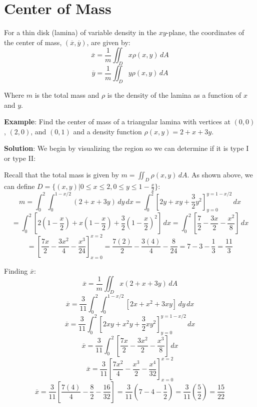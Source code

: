 \section{Center of Mass}
For a thin disk (lamina) of variable density in the $xy$-plane, the coordinates
of the center of mass, $(\overline{x}, \overline{y})$, are given by:
$$\overline{x} = \frac{1}{m} \iint_{\textit{D}} x \rho (x, y)\,dA$$
$$\overline{y} = \frac{1}{m} \iint_{\textit{D}} y \rho (x, y)\,dA$$

Where $m$ is the total mass and $\rho$ is the density of the lamina as a 
function of $x$ and $y$. 

\textbf{Example}: Find the center of mass of a triangular lamina with vertices 
at $(0, 0)$, $(2, 0)$, and $(0, 1)$ and a density function $\rho (x, y) = 2 + 
x + 3y$. 

\textbf{Solution}: We begin by visualizing the region so we can determine if 
it is type I or type II:


Recall that the total mass is given by $m = \iint_{\textit{D}} \rho (x, y)
\,dA$. As shown above, we can define $\textit{D} = \{ \left( x, y \right) | 0 
\leq x \leq 2, 0 \leq y \leq 1 - \frac{x}{2} \}$:
$$m = \int_{0}^{2} \int_{0}^{1 - x/2} \left( 2 + x + 3y \right) \,dy \,dx = 
\int_{0}^2 \left[2y + xy + \frac{3}{2}y^2 \right]_{y = 0}^{y = 1 - x/2}\,dx$$
$$= \int_0^2 \left[ 2(1 - \frac{x}{2}) + x(1 - \frac{x}{2}) + \frac{3}{2} (1 - 
\frac{x}{2})^2 \right]\,dx = \int_0^2 \left[ \frac{7}{2} - \frac{3x}{2} - 
\frac{x^2}{8} \right]\,dx$$
$$= \left[ \frac{7x}{2} - \frac{3x^2}{4} - \frac{x^3}{24} \right]_{x = 0}^{x = 
2} = \frac{7(2)}{2} - \frac{3(4)}{4} - \frac{8}{24} = 7 - 3 - \frac{1}{3} = 
\frac{11}{3}$$

Finding $\overline{x}$:
$$\overline{x} = \frac{1}{m} \iint_{\textit{D}} x \left( 2 + x + 3y \right) 
\,dA$$
$$\overline{x} = \frac{3}{11} \int_0^2 \int_0^{1 - x/2} \left[ 2x + x^2 + 3xy 
\right] \,dy \,dx$$
$$\overline{x} = \frac{3}{11} \int_0^2 \left[ 2xy + x^2y + \frac{3}{2}xy^2 
\right]_{y = 0}^{y = 1 - x/2} \,dx$$
$$\overline{x} = \frac{3}{11} \int_0^2 \left[ \frac{7x}{2} - \frac{3x^2}{2} - 
\frac{x^3}{8} \right]\,dx$$
$$\overline{x} = \frac{3}{11} \left[ \frac{7x^2}{4} - \frac{x^3}{2} - \frac{x
^4}{32} \right]_{x = 0}^{x = 2}$$
$$\overline{x} = \frac{3}{11} \left[ \frac{7(4)}{4} - \frac{8}{2} - \frac{16}{
32} \right] = \frac{3}{11} \left( 7 - 4 - \frac{1}{2} \right) = \frac{3}{11} 
\left( \frac{5}{2} \right) = \frac{15}{22}$$

